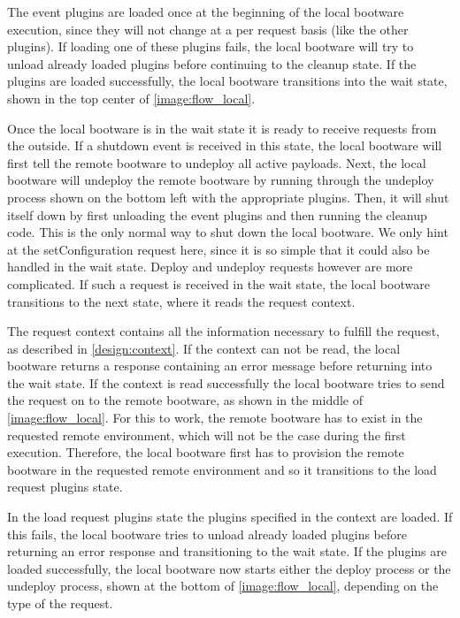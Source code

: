 The event plugins are loaded once at the beginning of the local bootware execution, since they will not change at a per request basis (like the other plugins).
If loading one of these plugins fails, the local bootware will try to unload already loaded plugins before continuing to the cleanup state.
If the plugins are loaded successfully, the local bootware transitions into the wait state, shown in the top center of \autoref{image:flow_local}.

Once the local bootware is in the wait state it is ready to receive requests from the outside.
If a shutdown event is received in this state, the local bootware will first tell the remote bootware to undeploy all active payloads.
Next, the local bootware will undeploy the remote bootware by running through the undeploy process shown on the bottom left with the appropriate plugins.
Then, it will shut itself down by first unloading the event plugins and then running the cleanup code.
This is the only normal way to shut down the local bootware.
We only hint at the setConfiguration request here, since it is so simple that it could also be handled in the wait state.
Deploy and undeploy requests however are more complicated.
If such a request is received in the wait state, the local bootware transitions to the next state, where it reads the request context.

The request context contains all the information necessary to fulfill the request, as described in \autoref{design:context}.
If the context can not be read, the local bootware returns a response containing an error message before returning into the wait state.
If the context is read successfully the local bootware tries to send the request on to the remote bootware, as shown in the middle of \autoref{image:flow_local}.
For this to work, the remote bootware has to exist in the requested remote environment, which will not be the case during the first execution.
Therefore, the local bootware first has to provision the remote bootware in the requested remote environment and so it transitions to the load request plugins state.

In the load request plugins state the plugins specified in the context are loaded.
If this fails, the local bootware tries to unload already loaded plugins before returning an error response and transitioning to the wait state.
If the plugins are loaded successfully, the local bootware now starts either the deploy process or the undeploy process, shown at the bottom of \autoref{image:flow_local}, depending on the type of the request.


